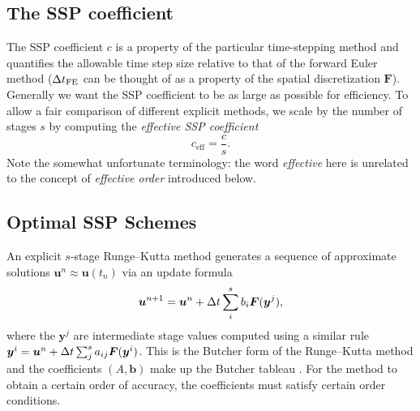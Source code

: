 \subsection{The SSP coefficient}

The SSP coefficient $c$ is a property of the particular time-stepping method and quantifies the allowable time step size relative to that of the forward Euler method
($\Delta t_{\text{FE}}$ can be thought of as a property of the spatial discretization $\bm{F}$).
Generally we want the SSP coefficient to be as large as possible for efficiency.
To allow a fair comparison of different explicit methods, we scale by the number of stages $s$ by computing the \emph{effective SSP coefficient}
$$c_{\text{eff}} = \frac{c}{s}.$$
Note the somewhat unfortunate terminology: the word \emph{effective} here is unrelated to the concept of \emph{effective order} introduced below.


\subsection{Optimal SSP Schemes}\label{subsec:Optimal_SSPRK}


An explicit $s$-stage Runge--Kutta method generates a sequence of approximate solutions $\bm{u}^n \approx \bm{u}(t_n)$ via an update formula
$$\bm{u}^{n+1} = \bm{u}^{n} + \Delta t \sum_i^s b_i \bm{F}(\bm{y}^j),$$
where the $\bm{y}^j$ are intermediate stage values computed using a similar rule
$\bm{y}^{i} = \bm{u}^{n} + \Delta t \sum_j^s a_{ij} \bm{F}(\bm{y}^i)$.
This is the Butcher form of the Runge--Kutta method and the coefficients $(A,\bm{b})$ make up the Butcher tableau \cite{Butcher2008_book}.
For the method to obtain a certain order of accuracy, the coefficients must satisfy certain order conditions.

